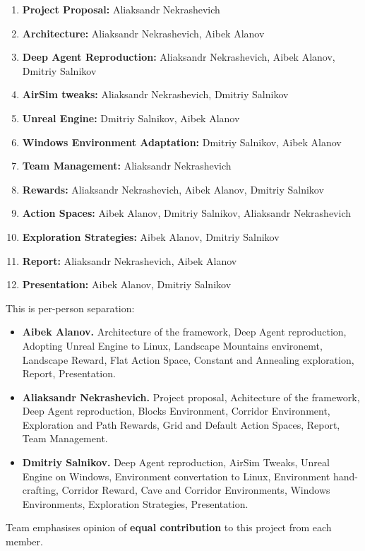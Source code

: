 \documentclass{article}
\begin{document}
\begin{enumerate}
    \item {\bf Project Proposal:} Aliaksandr Nekrashevich
    \item {\bf Architecture:} Aliaksandr Nekrashevich, Aibek Alanov
    \item {\bf Deep Agent Reproduction:} Aliaksandr Nekrashevich, Aibek Alanov, Dmitriy Salnikov
    \item {\bf AirSim tweaks:} Aliaksandr Nekrashevich, Dmitriy Salnikov
    \item {\bf Unreal Engine:} Dmitriy Salnikov, Aibek Alanov
    \item {\bf Windows Environment Adaptation:} Dmitriy Salnikov, Aibek Alanov
    \item {\bf Team Management:} Aliaksandr Nekrashevich
    \item {\bf Rewards:} Aliaksandr Nekrashevich, Aibek Alanov, Dmitriy Salnikov
    \item {\bf Action Spaces:} Aibek Alanov, Dmitriy Salnikov, Aliaksandr Nekrashevich
    \item {\bf Exploration Strategies:} Aibek Alanov, Dmitriy Salnikov
    \item {\bf Report:} Aliaksandr Nekrashevich, Aibek Alanov
    \item {\bf Presentation:} Aibek Alanov, Dmitriy Salnikov
\end{enumerate}

This is per-person separation:

\begin{itemize}
    \item {\bf Aibek Alanov.} Architecture of the framework, Deep Agent reproduction,
        Adopting Unreal Engine to Linux, Landscape Mountains environemt,
        Landscape Reward, Flat Action Space, Constant and Annealing exploration, 
        Report, Presentation.

    \item {\bf Aliaksandr Nekrashevich.} Project proposal, Achitecture of 
        the framework, Deep Agent reproduction, Blocks Environment, 
        Corridor Environment, Exploration and Path Rewards, 
        Grid and Default Action Spaces, Report, Team Management.

    \item {\bf Dmitriy Salnikov.} Deep Agent reproduction, AirSim Tweaks,
        Unreal Engine on Windows, Environment convertation to Linux,
        Environment hand-crafting, Corridor Reward, Cave and Corridor 
        Environments, Windows Environments, Exploration Strategies, 
        Presentation.
\end{itemize}

Team emphasises opinion of {\bf equal contribution} to this project from 
each member.



\end{document}
